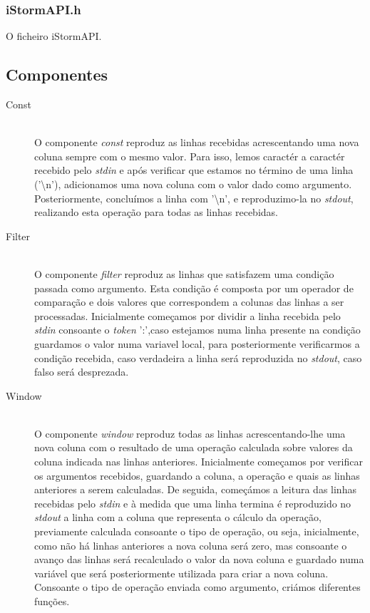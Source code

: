 \documentclass[12pt]{article}
\begin{document}
\subsubsection{iStormAPI.h}
O ficheiro iStormAPI.


\subsection{Componentes} 
\begin{description} 
\item[Const] \hfill \\
O componente \textit{const} reproduz as linhas recebidas acrescentando uma nova coluna sempre com o mesmo valor. Para isso, lemos caractér a caractér recebido pelo \textit{stdin} e após verificar que estamos no término de uma linha ('\textbackslash n'), adicionamos uma nova coluna com o valor dado como argumento. Posteriormente, concluímos a linha com '\textbackslash n', e reproduzimo-la no \textit{stdout}, realizando esta operação para todas as linhas recebidas. 

\item[Filter] \hfill \\
O componente \textit{filter} reproduz as linhas que satisfazem uma condição passada como argumento. Esta condição é composta por um operador de comparação e dois valores que correspondem a colunas das linhas a ser processadas. Inicialmente começamos por dividir a linha recebida pelo \textit{stdin} consoante o \textit{token} ':',caso estejamos numa linha presente na condição guardamos o valor numa variavel local, para posteriormente verificarmos a condição recebida, caso verdadeira a linha será reproduzida no \textit{stdout}, caso falso será desprezada.

\item[Window] \hfill \\
O componente \textit{window} reproduz todas as linhas acrescentando-lhe uma nova coluna com o resultado de uma operação calculada sobre valores da coluna indicada nas linhas anteriores. Inicialmente começamos por verificar os argumentos recebidos, guardando a coluna, a operação e quais as linhas anteriores a serem calculadas. De seguida, começámos a leitura das linhas recebidas pelo \textit{stdin} e à medida que uma linha termina é reproduzido no \textit{stdout} a linha com a coluna que representa o cálculo da operação, previamente calculada consoante o tipo de operação, ou seja, inicialmente, como não há linhas anteriores a nova coluna será zero, mas consoante o avanço das linhas será recalculado o valor da nova coluna e guardado numa variável que será posteriormente utilizada para criar a nova coluna. Consoante o tipo de operação enviada como argumento, criámos diferentes funções.


\end{description}
\end{document}
